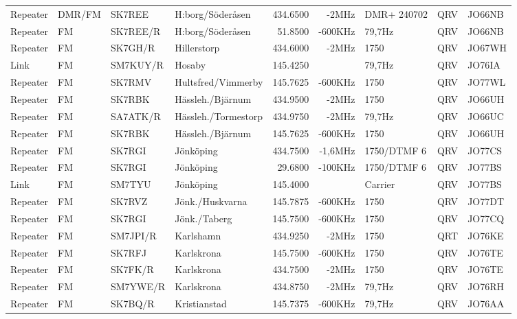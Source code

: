 \begin{landscape}
\begin{longtable}{llllrrlcl}
Repeater & DMR/FM & SK7REE   & H:borg/Söderåsen    & 434.6500  & -2MHz   & DMR+ 240702  & QRV  & JO66NB \\
Repeater & FM     & SK7REE/R & H:borg/Söderåsen    & 51.8500   & -600KHz & 79,7Hz       & QRV  & JO66NB \\
Repeater & FM     & SK7GH/R  & Hillerstorp         & 434.6000  & -2MHz   & 1750         & QRV  & JO67WH \\
Link     & FM     & SM7KUY/R & Hosaby              & 145.4250  &         & 79,7Hz       & QRV  & JO76IA \\
Repeater & FM     & SK7RMV   & Hultsfred/Vimmerby  & 145.7625  & -600KHz & 1750         & QRV  & JO77WL \\
Repeater & FM     & SK7RBK   & Hässleh./Bjärnum    & 434.9500  & -2MHz   & 1750         & QRV  & JO66UH \\
Repeater & FM     & SA7ATK/R & Hässleh./Tormestorp & 434.9750  & -2MHz   & 79,7Hz       & QRV  & JO66UC \\
Repeater & FM     & SK7RBK   & Hässleh./Bjärnum    & 145.7625  & -600KHz & 1750         & QRV  & JO66UH \\
Repeater & FM     & SK7RGI   & Jönköping           & 434.7500  & -1,6MHz & 1750/DTMF 6  & QRV  & JO77CS \\
Repeater & FM     & SK7RGI   & Jönköping           & 29.6800   & -100KHz & 1750/DTMF 6  & QRV  & JO77BS \\
Link     & FM     & SM7TYU   & Jönköping           & 145.4000  &         & Carrier      & QRV  & JO77BS \\
Repeater & FM     & SK7RVZ   & Jönk./Huskvarna     & 145.7875  & -600KHz & 1750         & QRV  & JO77DT \\
Repeater & FM     & SK7RGI   & Jönk./Taberg        & 145.7500  & -600KHz & 1750         & QRV  & JO77CQ \\
Repeater & FM     & SM7JPI/R & Karlshamn           & 434.9250  & -2MHz   & 1750         & QRT  & JO76KE \\
Repeater & FM     & SK7RFJ   & Karlskrona          & 145.7500  & -600KHz & 1750         & QRV  & JO76TE \\
Repeater & FM     & SK7FK/R  & Karlskrona          & 434.7500  & -2MHz   & 1750         & QRV  & JO76TE \\
Repeater & FM     & SM7YWE/R & Karlskrona          & 434.8750  & -2MHz   & 79,7Hz       & QRV  & JO76RH \\
Repeater & FM     & SK7BQ/R  & Kristianstad        & 145.7375  & -600KHz & 79,7Hz       & QRV  & JO76AA \\

\end{longtable}
\end{landscape}
